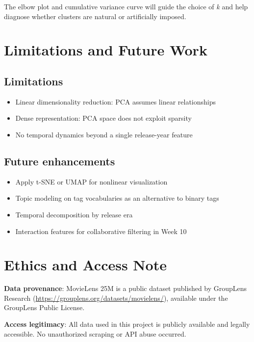 \documentclass[11pt]{article}
\begin{document}
The elbow plot and cumulative variance curve will guide the choice of \textit{k} and help diagnose whether clusters are natural or artificially imposed.

\section{Limitations and Future Work}

\subsection{Limitations}

\begin{itemize}[leftmargin=1.5em]
    \item Linear dimensionality reduction: PCA assumes linear relationships
    \item Dense representation: PCA space does not exploit sparsity
    \item No temporal dynamics beyond a single release-year feature
\end{itemize}

\subsection{Future enhancements}

\begin{itemize}[leftmargin=1.5em]
    \item Apply t-SNE or UMAP for nonlinear visualization
    \item Topic modeling on tag vocabularies as an alternative to binary tags
    \item Temporal decomposition by release era
    \item Interaction features for collaborative filtering in Week 10
\end{itemize}

\section{Ethics and Access Note}

\textbf{Data provenance}: MovieLens 25M is a public dataset published by GroupLens Research (\url{https://grouplens.org/datasets/movielens/}), available under the GroupLens Public License.

\textbf{Access legitimacy}: All data used in this project is publicly available and legally accessible. No unauthorized scraping or API abuse occurred.
\end{document}

